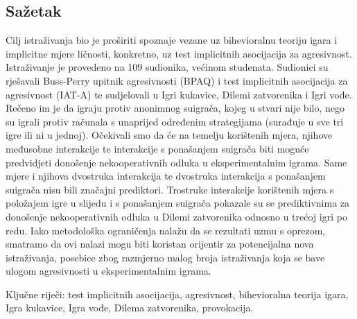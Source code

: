 \documentclass[a4paper, 12pt]{report}
\newcommand{\nocontentsline}[3]{}
\newcommand{\tocless}[2]{\bgroup\let\addcontentsline=\nocontentsline#1{#2}\egroup}
\begin{document}
\begin{singlespace}
    \tocless\section{Sažetak}

Cilj istraživanja bio je proširiti spoznaje vezane uz bihevioralnu teoriju igara i
implicitne mjere ličnosti, konkretno, uz
test implicitnih asocijacija za agresivnost. Istraživanje je provedeno na 109
sudionika, većinom studenata. Sudionici su rješavali Buss-Perry upitnik
agresivnosti (BPAQ) i test implicitnih asocijacija za agresivnost (IAT-A) te
sudjelovali u Igri kukavice, Dilemi zatvorenika i Igri vođe. Rečeno im je da
igraju protiv anonimnog suigrača, kojeg u stvari nije bilo, nego su igrali
protiv računala s unaprijed određenim strategijama (surađuje u sve tri igre ili
ni u jednoj). Očekivali smo da će na temelju korištenih mjera, njihove međusobne
interakcije te interakcije s ponašanjem suigrača biti moguće predvidjeti
donošenje nekooperativnih odluka u eksperimentalnim igrama. Same mjere i njihova
dvostruka interakcija te dvostruka interakcija s ponašanjem suigrača nisu bili
značajni prediktori. Trostruke interakcije korištenih mjera s položajem igre u
slijedu i s ponašanjem suigrača pokazale su se prediktivnima za donošenje
nekooperativnih odluka u Dilemi zatvorenika odnosno u trećoj igri po redu.
Iako metodološka ograničenja nalažu da se rezultati uzmu s oprezom, smatramo da 
ovi nalazi mogu biti koristan orijentir za potencijalna nova istraživanja,
posebice zbog razmjerno malog broja istraživanja koja se bave ulogom
agresivnosti u eksperimentalnim igrama.
\bigskip

\noindent Ključne riječi: test implicitnih asocijacija, agresivnost, 
bihevioralna teorija igara, Igra kukavice, Igra vođe, Dilema zatvorenika, provokacija.

\vspace*{\fill}

\tocless\section{Summary}


\end{singlespace}
\end{document}
